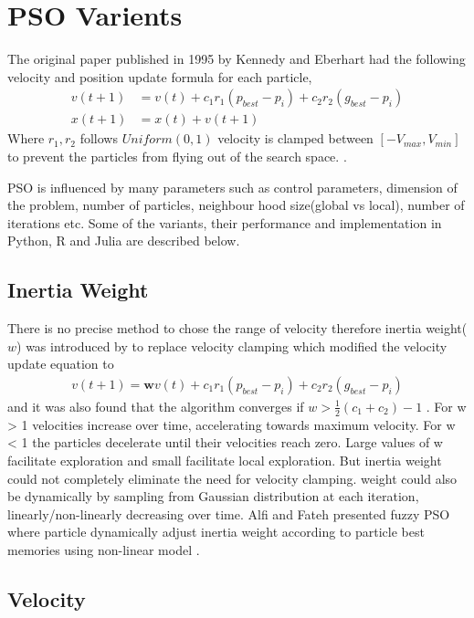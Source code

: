\documentclass{article}
\begin{document}
\section{PSO Varients}
The original paper published in 1995 by Kennedy and Eberhart had the following velocity and position update formula for each particle, 
\begin{align*}
v(t+1) &= v(t) + c_1r_1(p_{best} - p_i) + c_2r_2(g_{best} - p_i) \\
x(t+1) &= x(t) + v(t+1) 
\end{align*}
Where $r_1, r_2$ follows $Uniform(0,1)$ velocity is clamped between $[-V_{max}, V_{min}]$ to prevent the particles from flying out of the search space. \cite{kennedy1995particle}. 

PSO is influenced by many parameters such as control parameters, dimension of the problem, number of particles, neighbour hood size(global vs local), number of iterations etc. Some of the variants, their performance and implementation in Python, R and Julia are described below.


\subsection{Inertia Weight}
There is no precise method to chose the range of velocity therefore inertia weight($w$) was introduced by \cite{shi1998modified} to replace velocity clamping which modified the velocity update equation to  
\begin{align*} v(t+1) = \boldsymbol{w} v(t) + c_1r_1(p_{best} - p_i) + c_2r_2(g_{best} - p_i)
\end{align*} and it was also found that the algorithm converges if $w > \frac{1}{2}(c_1 + c_2) - 1$ \cite{van2007analysis}. For w > 1 velocities increase over time, accelerating towards maximum velocity. For w < 1 the particles decelerate until their velocities reach zero. Large values of w facilitate exploration and small facilitate local exploration. But inertia weight could not completely eliminate the need for velocity clamping. weight could also be dynamically by sampling from Gaussian distribution at each iteration, linearly/non-linearly decreasing over time. Alfi and Fateh presented fuzzy PSO where particle dynamically adjust inertia weight according to particle best memories using non-linear model \cite{alfi2011intelligent}.

\subsection{Velocity}
\end{document}
